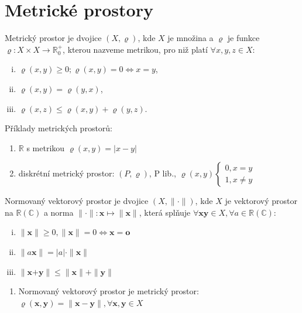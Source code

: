 \section{Metrické prostory}

\begin{definice}
 Metrický prostor je dvojice $(X, \varrho)$, kde $X$ je množina a $\varrho$ je funkce $\varrho: X \times X \to \mathbb R_0^+$, kterou nazveme metrikou, pro niž platí $\forall x, y, z \in X$:
 \begin{enumerate}[i)]
  \item $\varrho(x, y) \geq 0; \varrho(x,y) = 0 \iff x= y$,
  \item $\varrho(x, y) = \varrho (y,x)$,
  \item $\varrho(x, z)\leq \varrho(x, y) + \varrho (y, z)$.
 \end{enumerate}
\end{definice}

\begin{priklad} Příklady metrických prostorů:
  \begin{enumerate}[1)]
  \item $\mathbb R$ s metrikou $\varrho(x,y)=|x-y|$
  \item diskrétní metrický prostor: $(P, \varrho)$, P lib., $\varrho(x, y)\begin{cases}0, x = y \\ 1, x \neq y\end{cases}$
  \end{enumerate}
\end{priklad}

\begin{definice}
 Normovaný vektorový prostor je dvojice $(X, \|\cdot\|)$, kde $X$ je vektorový prostor na $\mathbb R(\mathbb C)$ a norma $\|\cdot\|:\textbf{x} \mapsto \|\textbf{x}\|$, která splňuje $\forall \textbf{x} \textbf{y} \in X, \forall a \in \mathbb R(\mathbb C)$:
 \begin{enumerate}[i)]
  \item $\|\textbf{x}\|\geq 0, \|\textbf{x}\|=0 \iff \textbf{x} = \textbf{o}$
  \item $\|a\textbf{x}\|=|a|\cdot \|\textbf{x}\|$
  \item $\|\textbf{x+y}\|\leq \|\textbf{x}\| + \|\textbf{y}\|$
 \end{enumerate}
\end{definice}

\begin{priklad}
  \begin{enumerate}[3)]
  \item Normovaný vektorový prostor je metrický prostor: $\varrho(\textbf{x}, \textbf{y}) = \|\textbf{x}-\textbf{y}\|, \forall \textbf{x}, \textbf{y} \in X$
  \end{enumerate}
\end{priklad}

